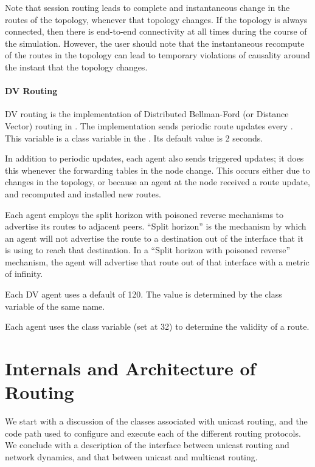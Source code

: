 Note that session routing leads to complete and instantaneous change
in the routes of the topology, whenever that topology changes.
If the topology is always connected, then there is
end-to-end connectivity at all times during the course of the simulation.
However, the user should note that the instantaneous recompute of the
routes in the topology can lead to temporary violations of causality
around the instant that the topology changes.

\paragraph{DV Routing}
DV routing is the implementation of
Distributed Bellman-Ford (or Distance Vector) routing in \ns.
The implementation sends periodic route updates every .
This variable is a class variable in the .
Its default value is 2 seconds.

In addition to periodic updates, each agent also sends triggered updates;
it does this whenever the forwarding tables in the node change.
This occurs either due to changes in the topology, 
or because an agent at the node received a route update,
and recomputed and installed new routes.

Each agent employs the split horizon with poisoned reverse mechanisms
to advertise its routes to adjacent peers.
``Split horizon'' is the mechanism by which an agent will not advertise
the route to a destination out of the interface that it is using to
reach that destination.
In a ``Split horizon with poisoned reverse'' mechanism,
the agent will advertise that route out of that interface with 
a metric of infinity.

Each DV agent uses a default  of 120.
The value is determined by the class variable of the same name.

Each agent uses the class variable  (set at 32)
to determine the validity of a route.

\section{Internals and Architecture of Routing}
\label{sec:rtg-internals}

We start with a discussion of the classes associated with
unicast routing, and the code path used to configure and execute
each of the different routing protocols.
We conclude with a description of
the interface between unicast routing and network dynamics, and
that between unicast and multicast routing.

